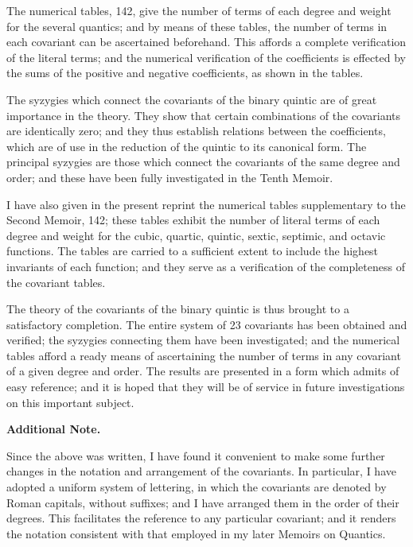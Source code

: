 \documentclass[11pt,a4paper]{book}
\begin{document}
The numerical tables, 142, give the number of terms of each degree and weight for the several quantics; and by means of these tables, the number of terms in each covariant can be ascertained beforehand. This affords a complete verification of the literal terms; and the numerical verification of the coefficients is effected by the sums of the positive and negative coefficients, as shown in the tables.

\clearpage
\setcounter{page}{291}

The syzygies which connect the covariants of the binary quintic are of great importance in the theory. They show that certain combinations of the covariants are identically zero; and they thus establish relations between the coefficients, which are of use in the reduction of the quintic to its canonical form. The principal syzygies are those which connect the covariants of the same degree and order; and these have been fully investigated in the Tenth Memoir.

I have also given in the present reprint the numerical tables supplementary to the Second Memoir, 142; these tables exhibit the number of literal terms of each degree and weight for the cubic, quartic, quintic, sextic, septimic, and octavic functions. The tables are carried to a sufficient extent to include the highest invariants of each function; and they serve as a verification of the completeness of the covariant tables.

The theory of the covariants of the binary quintic is thus brought to a satisfactory completion. The entire system of 23 covariants has been obtained and verified; the syzygies connecting them have been investigated; and the numerical tables afford a ready means of ascertaining the number of terms in any covariant of a given degree and order. The results are presented in a form which admits of easy reference; and it is hoped that they will be of service in future investigations on this important subject.

\clearpage
\setcounter{page}{292}

\begin{center}
\textbf{Additional Note.}
\end{center}

Since the above was written, I have found it convenient to make some further changes in the notation and arrangement of the covariants. In particular, I have adopted a uniform system of lettering, in which the covariants are denoted by Roman capitals, without suffixes; and I have arranged them in the order of their degrees. This facilitates the reference to any particular covariant; and it renders the notation consistent with that employed in my later Memoirs on Quantics.
\end{document}
